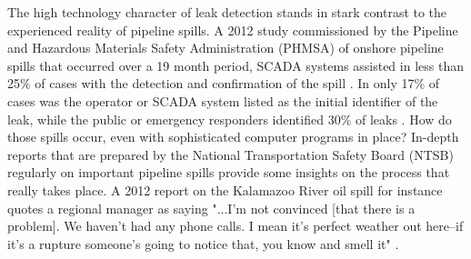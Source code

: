 \documentclass[12pt, man, natbib]{apa6}
\begin{document}
	The high technology character of leak detection stands in stark contrast to the experienced reality of pipeline spills. A 2012 study commissioned by the Pipeline and Hazardous Materials Safety Administration (PHMSA) of onshore pipeline spills that occurred over a 19 month period, SCADA systems assisted in less than 25\% of cases with the detection and confirmation of the spill \citep[p. 3-33]{Shaw2012}. In only 17\% of cases was the operator or SCADA system listed as the initial identifier of the leak, while the public or emergency responders identified 30\% of leaks \citep[p. 3-39]{Shaw2012}. How do those spills occur, even with sophisticated computer programs in place? In-depth reports that are prepared by the National Transportation Safety Board (NTSB) regularly on important pipeline spills provide some insights on the process that really takes place. A 2012 report on the Kalamazoo River oil spill for instance quotes a regional manager as saying "...I'm not convinced [that there is a problem]. We haven't had any phone calls. I mean it's perfect weather out here--if it's a rupture someone's going to notice that, you know and smell it" \citep[p. ]{NTSB2012}.
	
	
	
\end{document}
